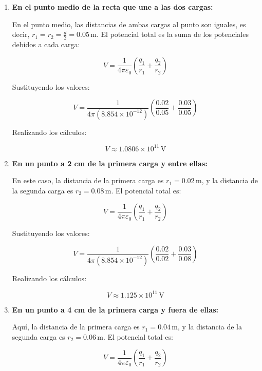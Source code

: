 \documentclass[answers]{exam} %
\begin{document}
\begin{questions}
	\vspace{0.5cm}

	\begin{enumerate}[label=\alph*)]
		\item \textbf{En el punto medio de la recta que une a las dos cargas:}

		      En el punto medio, las distancias de ambas cargas al punto son iguales, es decir, \( r_1 = r_2 = \frac{d}{2} = 0.05 \, \text{m} \). El potencial total es la suma de los potenciales debidos a cada carga:

		      \[
			      V = \frac{1}{4 \pi \varepsilon_0} \left( \frac{q_1}{r_1} + \frac{q_2}{r_2} \right)
		      \]

		      Sustituyendo los valores:

		      \[
			      V = \frac{1}{4 \pi (8.854 \times 10^{-12})} \left( \frac{0.02}{0.05} + \frac{0.03}{0.05} \right)
		      \]

		      Realizando los cálculos:

		      \[
			      V \approx 1.0806 \times 10^{11} \, \text{V}
		      \]

		\item \textbf{En un punto a 2 cm de la primera carga y entre ellas:}

		      En este caso, la distancia de la primera carga es \( r_1 = 0.02 \, \text{m} \), y la distancia de la segunda carga es \( r_2 = 0.08 \, \text{m} \). El potencial total es:

		      \[
			      V = \frac{1}{4 \pi \varepsilon_0} \left( \frac{q_1}{r_1} + \frac{q_2}{r_2} \right)
		      \]

		      Sustituyendo los valores:

		      \[
			      V = \frac{1}{4 \pi (8.854 \times 10^{-12})} \left( \frac{0.02}{0.02} + \frac{0.03}{0.08} \right)
		      \]

		      Realizando los cálculos:

		      \[
			      V \approx 1.125 \times 10^{11} \, \text{V}
		      \]

		\item \textbf{En un punto a 4 cm de la primera carga y fuera de ellas:}

		      Aquí, la distancia de la primera carga es \( r_1 = 0.04 \, \text{m} \), y la distancia de la segunda carga es \( r_2 = 0.06 \, \text{m} \). El potencial total es:

		      \[
			      V = \frac{1}{4 \pi \varepsilon_0} \left( \frac{q_1}{r_1} + \frac{q_2}{r_2} \right)
		      \]


\end{enumerate}
\end{questions}
\end{document}
